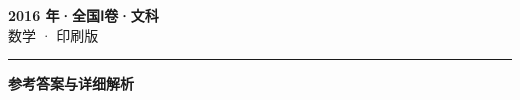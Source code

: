\documentclass[zihao=5, a4paper]{ctexart}
\begin{document}
\begin{center}
  {\Large\bfseries 2016 年·全国Ⅰ卷·文科}\\[4pt]
  {\large 数学 · 印刷版}
\end{center}
\medskip
{}

\par\bigskip\hrule\bigskip
{}
\begin{center}{\large\bfseries 参考答案与详细解析}\end{center}
\smallskip

\end{document}
